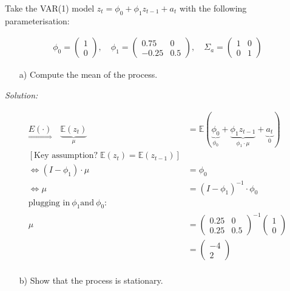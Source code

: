 \documentclass[12pt,a4paper]{article}
\begin{document}
Take the VAR(1) model \(z_t = \phi_0 + \phi_1 z_{t-1} + a_t\) with the
following parameterisation:

\begin{align*}
    \phi_0 = \begin{pmatrix} 1 \\ 0 \end{pmatrix}, \quad \phi_1 = \begin{pmatrix} 0.75 & 0 \\ -0.25 & 0.5 \end{pmatrix}, \quad \Sigma_a = \begin{pmatrix} 1 & 0 \\ 0 & 1 \end{pmatrix}
\end{align*}

\begin{itemize}
    \item[a)] Compute the mean of the process.
\end{itemize}

\emph{Solution:}

\begin{align*}
  \underset{\Rightarrow}{E(\cdot)} \quad \underbrace{ \mathbb{E} (z_t)}_{\mu} & = \mathbb{E} \left(  \underbrace{\phi_0}_{\phi_0} + \underbrace{\phi_1 z_{t -1}}_{\phi_1 \cdot \mu}+ \underbrace{a_t}_{0}\right)\\
  \left[ \text{Key assumption?} \;  \mathbb{E} (z_t)  = \mathbb{E} (z_{t-1}) \right]\\
  \Leftrightarrow \left( I - \phi_1 \right) \cdot \mu & = \phi_0\\
  \Leftrightarrow \mu & = \left( I - \phi_1 \right)^{-1} \cdot \phi_0\\
  \text{plugging in} \ \phi_1 \text{and} \ \phi_0:\\
  \mu & = \begin{pmatrix} 
  0.25 & 0 \\
  0.25 & 0.5
  \end{pmatrix}^{-1} 
  \begin{pmatrix} 
  1 \\
  0
  \end{pmatrix}\\
  & = 
  \begin{pmatrix} 
  -4 \\
  2
  \end{pmatrix}\\
\end{align*}

\begin{itemize}
    \item[b)] Show that the process is stationary.
\end{itemize}
\end{document}
